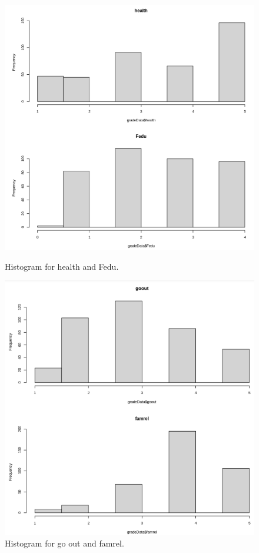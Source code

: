 \documentclass[a4paper]{article}
\begin{document}
\begin{figure}[H]
    \centering
    \begin{minipage}{0.5\textwidth}
        \centering
        \includegraphics[width = 1.045\linewidth]{Images/17.PNG}
        \caption{Histogram for health and Fedu.}
    \label{fig:hist10}
    \end{minipage}%
    \begin{minipage}{0.5\textwidth}
        \centering
        \includegraphics[width = 1\linewidth]{Images/18.PNG}
        \caption{Histogram for go out and famrel.}
        \label{fig:hist12}
        \end{minipage}
\end{figure}
\end{document}

